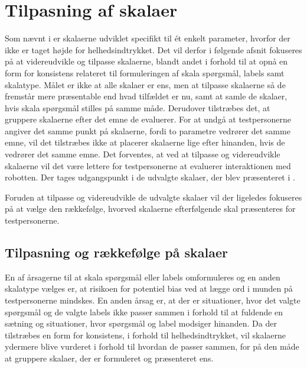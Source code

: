 \chapter{Tilpasning af skalaer}
\label{TestAfSkalaTilpasningAfSkalaer}
%
Som nævnt i  er skalaerne udviklet specifikt til ét enkelt parameter, hvorfor der ikke er taget højde for helhedsindtrykket. Det vil derfor i følgende afsnit fokuseres på at videreudvikle og tilpasse skalaerne, blandt andet i forhold til at opnå en form for konsistens relateret til formuleringen af skala spørgsmål, labels samt skalatype. Målet er ikke at alle skalaer er ens, men at tilpasse skalaerne så de fremstår mere præsentable end hvad tilfældet er nu, samt at samle de skalaer, hvis skala spørgsmål stilles på samme måde. Derudover tilstræbes det, at gruppere skalaerne efter det emne de evaluerer. For at undgå at testpersonerne angiver det samme punkt på skalaerne, fordi to parametre vedrører det samme emne, vil det tilstræbes ikke at placerer skalaerne lige efter hinanden, hvis de vedrører det samme emne. Det forventes, at ved at tilpasse og videreudvikle skalaerne vil det være lettere for testpersonerne at evaluerer interaktionen med robotten. Der tages udgangspunkt i de udvalgte skalaer, der blev præsenteret i .

Foruden at tilpasse og videreudvikle de udvalgte skalaer vil der ligeledes fokuseres på at vælge den rækkefølge, hvorved skalaerne efterfølgende skal præsenteres for testpersonerne.    
%
\section{Tilpasning og rækkefølge på skalaer}
\label{TilpasningSkalaer}
%
En af årsagerne til at skala spørgsmål eller labels omformuleres og en anden skalatype vælges er, at risikoen for potentiel bias ved at lægge ord i munden på testpersonerne mindskes. En anden årsag er, at der er situationer, hvor det valgte spørgsmål og de valgte labels ikke passer sammen i forhold til at fuldende en sætning og situationer, hvor spørgsmål og label modsiger hinanden. Da der tilstræbes en form for konsistens, i forhold til helhedsindtrykket, vil skalaerne ydermere blive vurderet i forhold til hvordan de passer sammen, for på den måde at gruppere skalaer, der er formuleret og præsenteret ens. 


